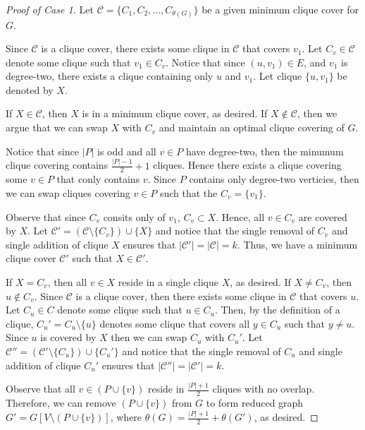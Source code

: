 \documentclass[../techreport.tex]{subfiles}
\begin{document}
\begin{proof}[Proof of Case 1]
	Let $\mathcal{C} = \{C_1, C_2, \dots, C_{\theta(G)}\}$ be a given minimum clique cover for $G$.

	Since $\mathcal{C}$ is a clique cover, there exists some clique in $\mathcal{C}$ that covers $v_1$. Let $C_v \in \mathcal{C}$ denote some clique such that $v_1 \in C_v$. Notice that since $(u, v_1) \in E$, and $v_1$ is degree-two, there exists a clique containing only $u$ and $v_1$. Let clique $\{u, v_1\}$ be denoted by $X$.

	If $X \in \mathcal{C}$, then $X$ is in a minimum clique cover, as desired. If $X \notin \mathcal{C}$, then we argue that we can swap $X$ with $C_v$ and maintain an optimal clique covering of $G$.

	Notice that since $|P|$ is odd and all $v \in P$ have degree-two, then the minumum clique covering contains $\frac{|P| - 1}{2} + 1$ cliques. Hence there exists a clique covering some $v \in P$ that conly contains $v$. Since $P$ contains only degree-two verticies, then we can swap cliques covering $v \in P$ such that the $C_v = \{v_1\}$.

	Observe that since $C_v$ consits only of $v_1$, $C_v \subset X$. Hence, all $v \in C_v$ are covered by $X$. Let $\mathcal{C'} = (\mathcal{C} \setminus \{C_v\}) \cup \{X\}$ and notice that the single removal of $C_v$ and single addition of clique $X$ ensures that $|\mathcal{C'}| = |\mathcal{C}| = k$. Thus, we have a minimum clique cover $\mathcal{C'}$ such that $X \in \mathcal{C'}$.

	If $X = C_v$, then all $v \in X$ reside in a single clique $X$, as desired. If $X \neq C_v$, then $u \notin C_v$. Since $\mathcal{C}$ is a clique cover, then there exists some clique in $\mathcal{C}$ that covers $u$. Let $C_u \in C$ denote some clique such that $u \in C_u$. Then, by the definition of a clique, $C_u' = C_u \setminus \{u\}$ denotes some clique that covers all $y \in C_u$ such that $y \neq u$. Since $u$ is covered by $X$ then we can swap $C_u$ with $C_u'$. Let $\mathcal{C''} = (\mathcal{C'} \setminus \{C_u\}) \cup \{C_u'\}$ and notice that the single removal of $C_u$ and single addition of clique $C_u'$ ensures that $|\mathcal{C''}| = |\mathcal{C'}| = k$.

	Observe that all $v \in (P \cup \{v\})$ reside in $\frac{|P| + 1}{2}$ cliques with no overlap. Therefore, we can remove $(P \cup \{v\})$ from $G$ to form reduced graph $G' = G[V \setminus (P \cup \{v\})]$, where $\theta(G) = \frac{|P| + 1}{2} + \theta(G')$, as desired.
\end{proof}
\end{document}
